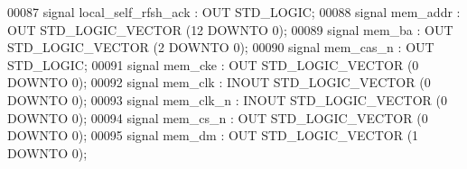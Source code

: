 \begin{DoxyCode}
00087                  \textcolor{keywordflow}{signal} \textcolor{vhdlchar}{local_self_rfsh_ack} \textcolor{vhdlchar}{:} \textcolor{keywordflow}{OUT} \textcolor{comment}{STD\_LOGIC};
00088                  \textcolor{keywordflow}{signal} \textcolor{vhdlchar}{mem_addr} \textcolor{vhdlchar}{:} \textcolor{keywordflow}{OUT} \textcolor{comment}{STD\_LOGIC\_VECTOR} \textcolor{vhdlchar}{(}\textcolor{vhdllogic}{}\textcolor{vhdllogic}{12} \textcolor{keywordflow}{DOWNTO} \textcolor{vhdllogic}{}\textcolor{vhdllogic}{0}\textcolor{vhdlchar}{)};
00089                  \textcolor{keywordflow}{signal} \textcolor{vhdlchar}{mem_ba} \textcolor{vhdlchar}{:} \textcolor{keywordflow}{OUT} \textcolor{comment}{STD\_LOGIC\_VECTOR} \textcolor{vhdlchar}{(}\textcolor{vhdllogic}{}\textcolor{vhdllogic}{2} \textcolor{keywordflow}{DOWNTO} \textcolor{vhdllogic}{}\textcolor{vhdllogic}{0}\textcolor{vhdlchar}{)};
00090                  \textcolor{keywordflow}{signal} \textcolor{vhdlchar}{mem_cas_n} \textcolor{vhdlchar}{:} \textcolor{keywordflow}{OUT} \textcolor{comment}{STD\_LOGIC};
00091                  \textcolor{keywordflow}{signal} \textcolor{vhdlchar}{mem_cke} \textcolor{vhdlchar}{:} \textcolor{keywordflow}{OUT} \textcolor{comment}{STD\_LOGIC\_VECTOR} \textcolor{vhdlchar}{(}\textcolor{vhdllogic}{}\textcolor{vhdllogic}{0} \textcolor{keywordflow}{DOWNTO} \textcolor{vhdllogic}{}\textcolor{vhdllogic}{0}\textcolor{vhdlchar}{)};
00092                  \textcolor{keywordflow}{signal} \textcolor{vhdlchar}{mem_clk} \textcolor{vhdlchar}{:} \textcolor{keywordflow}{INOUT} \textcolor{comment}{STD\_LOGIC\_VECTOR} \textcolor{vhdlchar}{(}\textcolor{vhdllogic}{}\textcolor{vhdllogic}{0} \textcolor{keywordflow}{DOWNTO} \textcolor{vhdllogic}{}\textcolor{vhdllogic}{0}\textcolor{vhdlchar}{)};
00093                  \textcolor{keywordflow}{signal} \textcolor{vhdlchar}{mem_clk_n} \textcolor{vhdlchar}{:} \textcolor{keywordflow}{INOUT} \textcolor{comment}{STD\_LOGIC\_VECTOR} \textcolor{vhdlchar}{(}\textcolor{vhdllogic}{}\textcolor{vhdllogic}{0} \textcolor{keywordflow}{DOWNTO} \textcolor{vhdllogic}{}\textcolor{vhdllogic}{0}\textcolor{vhdlchar}{)};
00094                  \textcolor{keywordflow}{signal} \textcolor{vhdlchar}{mem_cs_n} \textcolor{vhdlchar}{:} \textcolor{keywordflow}{OUT} \textcolor{comment}{STD\_LOGIC\_VECTOR} \textcolor{vhdlchar}{(}\textcolor{vhdllogic}{}\textcolor{vhdllogic}{0} \textcolor{keywordflow}{DOWNTO} \textcolor{vhdllogic}{}\textcolor{vhdllogic}{0}\textcolor{vhdlchar}{)};
00095                  \textcolor{keywordflow}{signal} \textcolor{vhdlchar}{mem_dm} \textcolor{vhdlchar}{:} \textcolor{keywordflow}{OUT} \textcolor{comment}{STD\_LOGIC\_VECTOR} \textcolor{vhdlchar}{(}\textcolor{vhdllogic}{}\textcolor{vhdllogic}{1} \textcolor{keywordflow}{DOWNTO} \textcolor{vhdllogic}{}\textcolor{vhdllogic}{0}\textcolor{vhdlchar}{)};

\end{DoxyCode}
